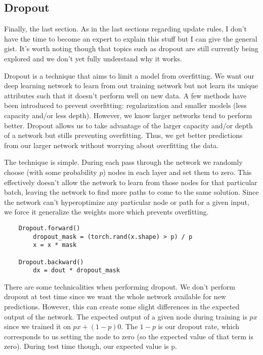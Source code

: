 \documentclass[12pt]{article}
\begin{document}
\subsection{Dropout}
Finally, the last section. As in the last sections regarding update rules, I don't have the time 
to become an expert to explain this stuff but I can give the general gist. It's worth noting though
that topics such as dropout are still currently being explored and we don't yet fully understand 
why it works. 

Dropout is a technique that aims to limit a model from overfitting. We want our deep learning network
to learn from out training network but not learn its unique attributes such that it doesn't perform 
well on new data. A few methods have been introduced to prevent overfitting: regularization and smaller
models (less capacity and/or less depth). However, we know larger networks tend to perform better. Dropout allows us 
to take advantage of the larger capacity and/or depth of a network but stills preventing overfitting. Thus,
we get better predictions from our larger network without worrying about overfitting the data. 

The technique is simple. During each pass through the network we randomly choose (with some probability
$p$) nodes in each layer and set them to zero. This effectively doesn't allow the network to learn from 
those nodes for that particular batch, leaving the network to find more paths to come to the same solution.
Since the network can't hyperoptimize any particular node or path for a given input, we force it 
generalize the weights more which prevents overfitting. 

\begin{verbatim}
    Dropout.forward()
        dropout_mask = (torch.rand(x.shape) > p) / p
        x = x * mask

    Dropout.backward()
        dx = dout * dropout_mask
\end{verbatim}


There are some technicalities when performing dropout. We don't perform dropout at test time since we 
want the whole network available for new predictions. However, this can create some slight differences 
in the expected output of the network. The expected output of a given node during training is 
$px$ since we trained it on $px + (1-p)0$. The $1-p$ is our dropout rate, which corresponds to us 
setting the node to zero (so the expected value of that term is zero). During test time though, our 
expected value is p. 
\end{document}
